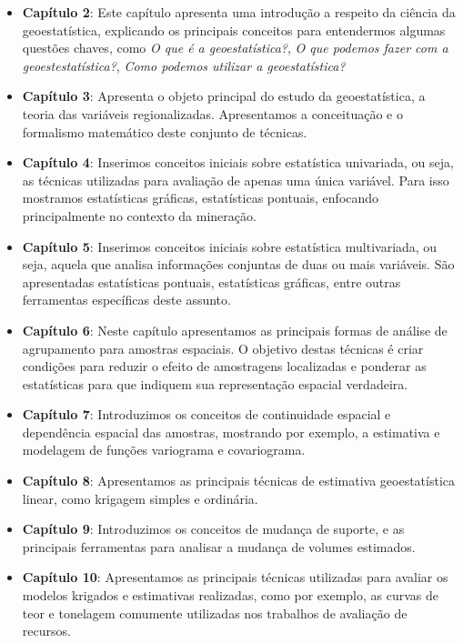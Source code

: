 \documentclass[12pt,fleqn]{book} %
\begin{document}
\begin{itemize}
	\item \textbf{Capítulo 2}: Este capítulo apresenta uma introdução a respeito da ciência da geoestatística, explicando os principais conceitos para entendermos algumas questões chaves, como \textit{O que é a geoestatística?}, \textit{O que podemos fazer com a geoestestatística?}, \textit{Como podemos utilizar a geoestatística?}
	\item \textbf{Capítulo 3}:  Apresenta o objeto principal do estudo da geoestatística, a teoria das variáveis regionalizadas. Apresentamos a conceituação e o formalismo matemático deste conjunto de técnicas. 
	\item \textbf{Capítulo 4}:  Inserimos conceitos iniciais sobre estatística univariada, ou seja, as técnicas utilizadas para avaliação de apenas uma única variável. Para isso mostramos estatísticas gráficas, estatísticas pontuais, enfocando principalmente no contexto da mineração. 
	\item \textbf{Capítulo 5}:  Inserimos conceitos iniciais sobre estatística multivariada, ou seja, aquela que analisa informações conjuntas de duas ou mais variáveis. São apresentadas estatísticas pontuais, estatísticas gráficas, entre outras ferramentas específicas deste assunto. 
	\item \textbf{Capítulo 6}:  Neste capítulo apresentamos as principais formas de análise de agrupamento para amostras espaciais. O objetivo destas técnicas é criar condições para reduzir o efeito de amostragens localizadas e ponderar as estatísticas para que indiquem  sua representação espacial verdadeira.
	\item \textbf{Capítulo 7}:  Introduzimos os conceitos de continuidade espacial e dependência espacial das amostras, mostrando por exemplo, a estimativa e modelagem de funções variograma e covariograma. 
	\item \textbf{Capítulo 8}:  Apresentamos as principais técnicas de estimativa geoestatística linear, como krigagem simples e ordinária. 
	\item \textbf{Capítulo 9}:  Introduzimos os conceitos de mudança de suporte, e as principais ferramentas para analisar a mudança de volumes estimados. 
	\item \textbf{Capítulo 10}: Apresentamos as principais técnicas utilizadas para avaliar os modelos krigados e estimativas realizadas, como por exemplo, as curvas de teor e tonelagem comumente utilizadas nos trabalhos de avaliação de recursos.
	
\end{itemize}
\end{document}
